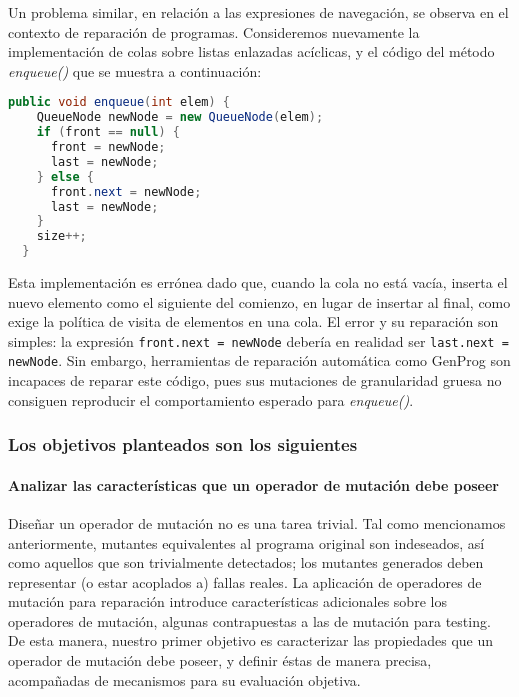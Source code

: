 Un problema similar, en relaci\'on a las expresiones de navegaci\'on, se observa en el contexto de reparaci\'on de programas. Consideremos nuevamente la implementaci\'on de colas sobre listas enlazadas ac\'iclicas, y el c\'odigo del m\'etodo \emph{enqueue()} que se muestra a continuaci\'on:
\begin{lstlisting}[frame=tlrb, mathescape=true, language=Java,basicstyle={},xleftmargin=.01\textwidth,xrightmargin=.01\textwidth]
  public void enqueue(int elem) {
    QueueNode newNode = new QueueNode(elem);
    if (front == null) {
      front = newNode;
      last = newNode;
    } else {
      front.next = newNode;
      last = newNode;
    }
    size++;
  }
\end{lstlisting}
Esta implementaci\'on es err\'onea dado que, cuando la cola no est\'a vac\'ia, inserta el nuevo elemento como el siguiente del comienzo, en lugar de insertar al final, como exige la pol\'itica de visita de elementos en una cola. El error y su reparaci\'on son simples: la expresi\'on \texttt{front.next = newNode} deber\'ia en realidad ser \texttt{last.next = newNode}. Sin embargo, herramientas de reparaci\'on autom\'atica como GenProg son incapaces de reparar este c\'odigo, pues sus mutaciones de granularidad gruesa no consiguen reproducir el comportamiento esperado para \emph{enqueue()}. 

\subsubsection*{Los objetivos planteados son los siguientes}

\paragraph{Analizar las caracter\'isticas que un operador de mutaci\'on debe poseer}
Dise\~nar un operador de mutaci\'on no es una tarea trivial. Tal como mencionamos anteriormente, mutantes equivalentes al programa original son indeseados, as\'i como aquellos que son trivialmente detectados; los mutantes generados deben representar (o estar acoplados a) fallas reales. La aplicaci\'on de operadores de mutaci\'on para reparaci\'on introduce caracter\'isticas adicionales sobre los operadores de mutaci\'on, algunas contrapuestas a las de mutaci\'on para testing. De esta manera, nuestro primer objetivo es caracterizar las propiedades que un operador de mutaci\'on debe poseer, y definir \'estas de manera precisa, acompa\~nadas de mecanismos para su evaluaci\'on objetiva. 

